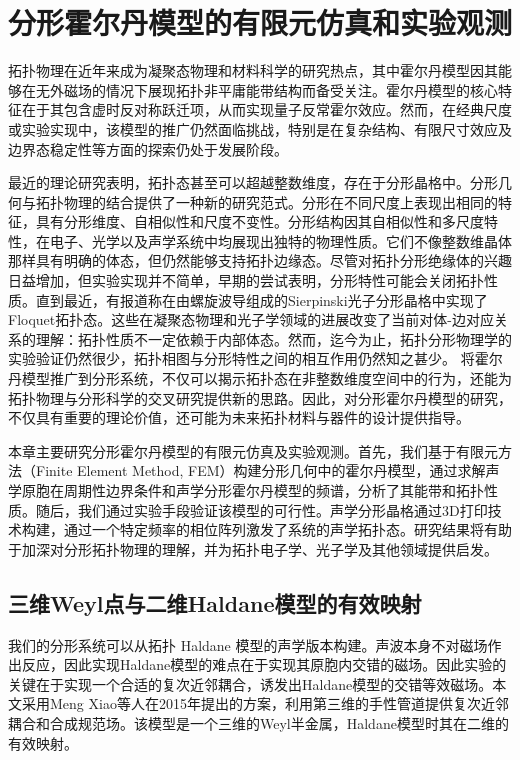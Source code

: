 \chapter{分形霍尔丹模型的有限元仿真和实验观测}
拓扑物理在近年来成为凝聚态物理和材料科学的研究热点，其中霍尔丹模型因其能够在无外磁场的情况下展现拓扑非平庸能带结构而备受关注。霍尔丹模型的核心特征在于其包含虚时反对称跃迁项，从而实现量子反常霍尔效应。然而，在经典尺度或实验实现中，该模型的推广仍然面临挑战，特别是在复杂结构、有限尺寸效应及边界态稳定性等方面的探索仍处于发展阶段。

最近的理论研究表明，拓扑态甚至可以超越整数维度，存在于分形晶格中\cite{song2014topological,pai2019topological,iliasov2020hall,fremling2020existence,yang2020photonic,ivaki2022topological}。分形几何与拓扑物理的结合提供了一种新的研究范式。分形在不同尺度上表现出相同的特征，具有分形维度、自相似性和尺度不变性\cite{Mandelbrot1982,gouyet1997physics}。分形结构因其自相似性和多尺度特性，在电子、光学以及声学系统中均展现出独特的物理性质。它们不像整数维晶体那样具有明确的体态，但仍然能够支持拓扑边缘态。尽管对拓扑分形绝缘体的兴趣日益增加，但实验实现并不简单，早期的尝试\cite{liu2021sierpinski}表明，分形特性可能会关闭拓扑性质。直到最近，有报道称在由螺旋波导组成的Sierpinski光子分形晶格中实现了Floquet拓扑态\cite{yang2020photonic,biesenthal2022fractal}。这些在凝聚态物理和光子学领域的进展改变了当前对体-边对应关系的理解：拓扑性质不一定依赖于内部体态。然而，迄今为止，拓扑分形物理学的实验验证仍然很少，拓扑相图与分形特性之间的相互作用仍然知之甚少。 将霍尔丹模型推广到分形系统，不仅可以揭示拓扑态在非整数维度空间中的行为，还能为拓扑物理与分形科学的交叉研究提供新的思路。因此，对分形霍尔丹模型的研究，不仅具有重要的理论价值，还可能为未来拓扑材料与器件的设计提供指导。

本章主要研究分形霍尔丹模型的有限元仿真及实验观测。首先，我们基于有限元方法（Finite Element Method, FEM）构建分形几何中的霍尔丹模型，通过求解声学原胞在周期性边界条件和声学分形霍尔丹模型的频谱，分析了其能带和拓扑性质。随后，我们通过实验手段验证该模型的可行性。声学分形晶格通过3D打印技术构建，通过一个特定频率的相位阵列激发了系统的声学拓扑态。研究结果将有助于加深对分形拓扑物理的理解，并为拓扑电子学、光子学及其他领域提供启发。
\section{三维Weyl点与二维Haldane模型的有效映射}
我们的分形系统可以从拓扑 Haldane 模型的声学版本构建。声波本身不对磁场作出反应，因此实现Haldane模型的难点在于实现其原胞内交错的磁场。因此实验的关键在于实现一个合适的复次近邻耦合，诱发出Haldane模型的交错等效磁场。本文采用Meng Xiao等人在2015年提出的方案\cite{xiao2015synthetic}，利用第三维的手性管道提供复次近邻耦合和合成规范场。该模型是一个三维的Weyl半金属，Haldane模型时其在二维的有效映射。

